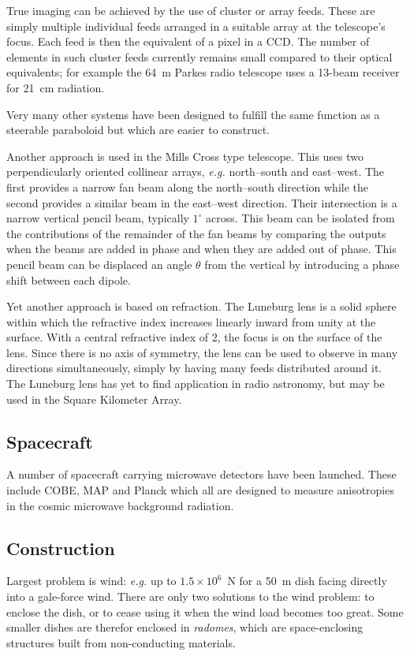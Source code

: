True imaging can be achieved by the use of cluster or array feeds. 
These are simply multiple individual feeds arranged in a suitable array at
the telescope's focus. Each feed is then the equivalent of a pixel in a CCD.
The number of elements in such cluster feeds currently remains small compared
to their optical equivalents; for example the 64~m Parkes radio telescope
uses a 13-beam receiver for 21~cm radiation. 

Very many other systems have been designed to fulfill the same function as
a steerable paraboloid but which are easier to construct. 

Another approach is used in the Mills Cross type telescope. This uses
two perpendicularly oriented collinear arrays, {\it e.g.} 
north--south and east--west. The first provides a
narrow fan beam along the north--south direction while the second provides a similar 
beam in the east--west direction. Their intersection is a narrow vertical pencil beam, 
typically $1^{\circ}$ across. This beam can be isolated from the contributions of the 
remainder of the fan beams by comparing the outputs when the beams are added 
in phase and when they are added out of phase. This pencil beam can be displaced
an angle $\theta$ from the vertical by introducing a phase shift between each dipole.

Yet another approach is based on refraction. The Luneburg lens is a solid sphere 
within which the refractive index increases linearly inward from unity at the surface.
With a central refractive index of 2, the focus is on the surface of the lens. Since there
is no axis of symmetry, the lens can be used to observe in many directions simultaneously,
simply by having many feeds distributed around it. The Luneburg lens has yet to 
find application in radio astronomy, but may be used in the Square Kilometer Array.

\subsection{Spacecraft}
A number of spacecraft carrying microwave detectors have been launched. 
These include COBE, MAP and Planck which all are designed to measure anisotropies in
 the cosmic microwave background radiation.

\subsection{Construction}

Largest problem is wind: {\it e.g.} up to $1.5\times 10^6$~N for a 50~m dish 
facing directly into a gale-force wind. There are only two solutions to the wind problem:
to enclose the dish, or to cease using it when the wind load becomes too great. Some 
smaller dishes are therefor enclosed in {\it radomes}, which are space-enclosing structures
built from non-conducting materials.

